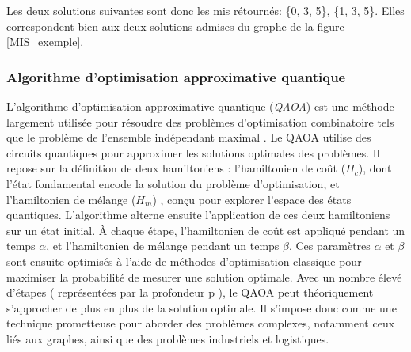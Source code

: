 \documentclass[11pt]{article}
\begin{document}
Les deux solutions suivantes sont donc les mis rétournés: \{0, 3, 5\}, \{1, 3, 5\}. Elles correspondent bien aux deux solutions admises du graphe de la figure \ref{MIS_exemple}.



\subsubsection{Algorithme d'optimisation approximative quantique} 
 
 L'algorithme d'optimisation approximative quantique (\textit{QAOA}) est une méthode largement utilisée pour résoudre des problèmes d'optimisation combinatoire tels que le problème de l'ensemble indépendant maximal \cite{farhi_quantum_2014}. Le QAOA utilise des circuits quantiques pour approximer les solutions optimales des problèmes. Il repose sur la définition de deux hamiltoniens : l'hamiltonien de coût ($H_c$), dont l'état fondamental encode la solution du problème d’optimisation, et l'hamiltonien de mélange ($H_m$) , conçu pour explorer l'espace des états quantiques. 
 L'algorithme alterne ensuite l'application de ces deux hamiltoniens sur un état initial. À chaque étape, l'hamiltonien de coût est appliqué pendant un temps $\alpha$, et l'hamiltonien de mélange pendant un temps $\beta$.  Ces paramètres $\alpha$ et $\beta$ sont ensuite optimisés à l'aide de méthodes d'optimisation classique pour maximiser la probabilité de mesurer une solution optimale.
 Avec un nombre élevé d'étapes ( représentées par la profondeur p ), le QAOA peut théoriquement s'approcher de plus en plus de la solution optimale. Il s'impose donc comme une technique prometteuse pour aborder des problèmes complexes, notamment ceux liés aux graphes, ainsi que des problèmes industriels et logistiques.
\end{document}

